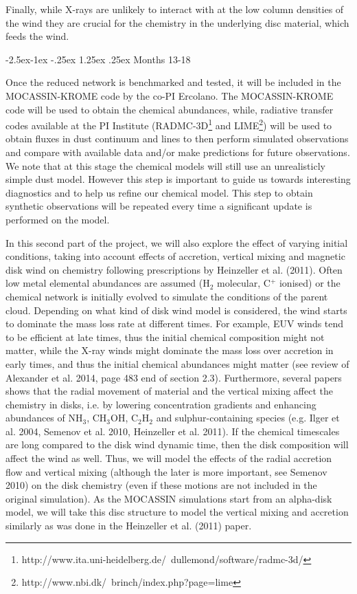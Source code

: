 \documentclass[10pt,fleqn,twoside]{article}
\makeatletter
\renewcommand\paragraph{\@startsection{paragraph}{4}{\z@}%
            {-2.5ex\@plus -1ex \@minus -.25ex}%
            {1.25ex \@plus .25ex}%
            {\normalfont\normalsize\bfseries}}
\makeatother
\begin{document}
Finally, while X-rays are unlikely to interact with at the low column densities of the wind they are crucial for the chemistry in the underlying disc material, which feeds the wind. 

\paragraph{Months 13-18}

 Once the reduced network is benchmarked and tested, it will be included in the MOCASSIN-KROME code by the co-PI Ercolano. The MOCASSIN-KROME code will be used to obtain the chemical abundances, while, radiative transfer codes available at the PI Institute (RADMC-3D\footnote{http://www.ita.uni-heidelberg.de/~dullemond/software/radmc-3d/} and LIME\footnote{http://www.nbi.dk/~brinch/index.php?page=lime}) will be used to obtain fluxes in dust continuum and lines to then perform simulated observations and compare with available data and/or make predictions for future observations. We note that at this stage the chemical models will still use an unrealisticly simple dust model. However this step is important to guide us towards interesting diagnostics and to help us refine our chemical model. This step to obtain synthetic observations will be repeated every time a significant update is performed on the model. 

In this second part of the project, we will also explore the effect of varying initial conditions, taking into account effects of accretion, vertical mixing and magnetic disk wind on chemistry following prescriptions by Heinzeller et al. (2011). Often low metal elemental abundances are assumed (H$_2$ molecular, C$^+$ ionised) or the chemical network is initially evolved to simulate the conditions of the parent cloud.  Depending on what kind of disk wind model is considered, the wind starts to dominate the mass loss rate at different times. For example, EUV winds tend to be efficient at late times, thus the initial chemical composition might not matter, while the X-ray winds might dominate the mass loss over accretion in early times, and thus the initial chemical abundances might matter (see review of Alexander et al. 2014, page 483 end of section 2.3). Furthermore, several papers shows that the radial movement of material and the vertical mixing affect the chemistry in disks, i.e. by lowering concentration gradients and enhancing abundances of NH$_3$, CH$_3$OH, C$_2$H$_2$ and sulphur-containing species (e.g. Ilger et al. 2004, Semenov et al. 2010, Heinzeller et al. 2011). If the chemical timescales are long compared to the disk wind dynamic time, then the disk composition will affect the wind as well. Thus, we will model the effects of the radial accretion flow and vertical mixing (although the later is more important, see Semenov 2010) on the disk chemistry (even if these motions are not included in the original simulation). As the MOCASSIN simulations start from an alpha-disk model, we will take this disc structure to model the vertical mixing and accretion similarly as was done in the Heinzeller et al. (2011) paper.
\end{document}
